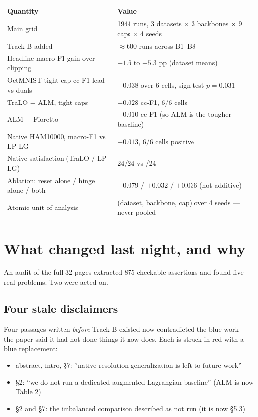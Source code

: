 \documentclass[11pt,a4paper]{article}
\begin{document}
\begin{center}\small
\begin{tabular}{p{6.6cm}l}
\toprule
Quantity & Value \\
\midrule
Main grid & 1944 runs, 3 datasets $\times$ 3 backbones $\times$ 9 caps $\times$ 4 seeds \\
Track B added & $\approx$600 runs across B1--B8 \\
Headline macro-F1 gain over clipping & $+1.6$ to $+5.3$ pp (dataset means) \\
OctMNIST tight-cap cc-F1 lead vs duals & $+0.038$ over 6 cells, sign test $p{=}0.031$ \\
TraLO $-$ ALM, tight caps & $+0.028$ cc-F1, 6/6 cells \\
ALM $-$ Fioretto & $+0.010$ cc-F1 (so ALM is the tougher baseline) \\
Native HAM10000, macro-F1 vs LP-LG & $+0.013$, 6/6 cells positive \\
Native satisfaction (TraLO / LP-LG) & 24/24 \; vs \; 0/24 \\
Ablation: reset alone / hinge alone / both & $+0.079$ \; / \; $+0.032$ \; / \; $+0.036$ (not additive) \\
Atomic unit of analysis & (dataset, backbone, cap) over 4 seeds --- never pooled \\
\bottomrule
\end{tabular}
\end{center}

\section{What changed last night, and why}

An audit of the full 32 pages extracted 875 checkable assertions and found five real
problems. Two were acted on.

\subsection{Four stale disclaimers}
Four passages written \emph{before} Track B existed now contradicted the blue work --- the
paper said it had not done things it now does. Each is struck in red with a blue
replacement:

\begin{itemize}
\item abstract, intro, \S7: ``native-resolution generalization is left to future work''
\item \S2: ``we do not run a dedicated augmented-Lagrangian baseline'' (ALM is now Table 2)
\item \S2 and \S7: the imbalanced comparison described as not run (it is now \S5.3)
\end{itemize}
\end{document}
